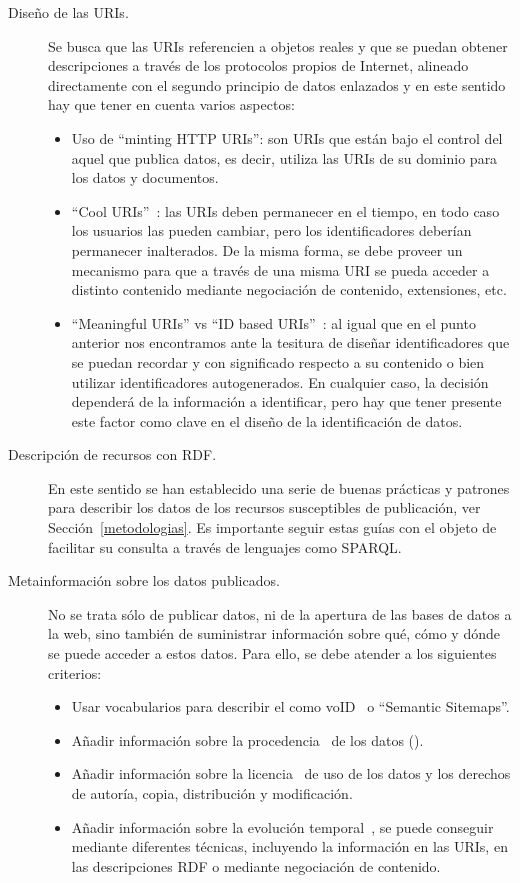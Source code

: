 \begin{description}
 \item [Diseño de las \gls{URI}s.] Se busca que las URIs referencien a objetos reales y que se puedan obtener
descripciones a través de los protocolos propios de Internet, alineado directamente con el segundo principio de datos
enlazados y en este sentido hay que tener en cuenta varios aspectos: 
\begin{itemize}
 \item Uso de ``minting \gls{HTTP URI}s'': son URIs que están bajo el control del aquel que publica datos, es decir, utiliza
las URIs de su dominio para los datos y documentos.
\item ``Cool URIs''~\cite{Sauermann+2007a,bernerslee1998uri}: las URIs deben permanecer en el tiempo, en todo caso los usuarios las pueden cambiar, pero los identificadores
deberían permanecer inalterados. De la misma forma, se debe proveer un mecanismo para que a través de una misma URI se pueda
acceder a distinto contenido mediante negociación de contenido, extensiones, etc. 
\item ``Meaningful URIs'' vs ``ID based URIs''~\cite{uris-uk}: al igual que en el punto anterior nos encontramos ante la tesitura
de diseñar identificadores que se puedan recordar y con significado respecto a su contenido o bien utilizar
identificadores autogenerados. En cualquier caso, la decisión dependerá de la información a identificar, pero 
hay que tener presente este factor como clave en el diseño de la identificación de datos.
\end{itemize}
\item [Descripción de recursos con \gls{RDF}.] En este sentido se han establecido una serie de buenas prácticas y patrones
para describir los datos de los recursos susceptibles de publicación, ver Sección~\ref{metodologias}. Es importante seguir estas guías con el objeto de facilitar
su consulta a través de lenguajes como \gls{SPARQL}.
\item [Metainformación sobre los datos publicados.] No se trata sólo de publicar datos, ni de la apertura de las bases de datos
a la web, sino también de suministrar información sobre qué, cómo y dónde se puede acceder a estos datos. Para ello,
se debe atender a los siguientes criterios:
\begin{itemize}
 \item Usar vocabularios para describir el \dataset como \gls{voID}~\cite{void} o ``Semantic Sitemaps''\cite{Cyganiak08semanticsitemaps}.
 \item Añadir información sobre la procedencia~\cite{DBLP:conf/ipaw/HartigZ10,w3c-prov} de los datos (\provenance).
 \item Añadir información sobre la licencia~\cite{ld-licencias} de uso de los datos y los derechos de autoría, copia, distribución y modificación.
 \item Añadir información sobre la evolución temporal~\cite{ld-memento}, se puede conseguir mediante diferentes técnicas, incluyendo
la información en las URIs, en las descripciones RDF o mediante negociación de contenido.
\end{itemize}


\end{description}
